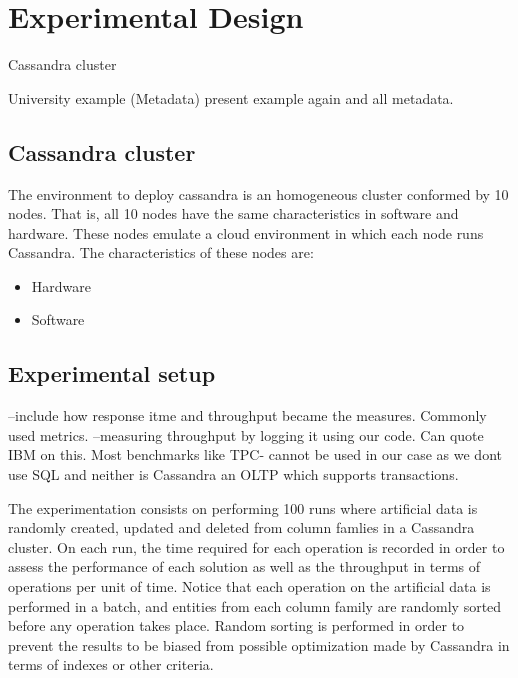 \chapter{Experimental Design}
Cassandra cluster

University example (Metadata) present example again and all metadata.

\section{Cassandra cluster}

The environment to deploy cassandra is  an homogeneous cluster conformed by 10
nodes. That is, all 10 nodes have the same characteristics in software and
hardware. These nodes emulate a cloud environment in which each node runs
Cassandra. The characteristics of these nodes are:

\begin{itemize}
  \item Hardware
  \item Software
\end{itemize}




\section{Experimental setup}\label{s:exp:setup}

--include how response itme and throughput became the measures. Commonly used
metrics.
--measuring throughput by logging it using our code. Can quote IBM on this. Most
benchmarks like TPC- cannot be used in our case as we dont use SQL and neither
is Cassandra an OLTP which supports transactions.

 The experimentation consists
on performing 100 runs where artificial data is randomly created, updated and deleted from column famlies in a Cassandra cluster.
On each run, the time required for each operation is recorded in order to assess the
performance of each solution as well as the throughput in terms of operations
per unit of time. Notice that each operation on the artificial data  is
performed in a batch, and entities from each column family are randomly sorted
before any operation takes place. Random sorting is performed in order to
prevent the results to be biased from possible optimization made by Cassandra in
terms of indexes or other criteria.
		
